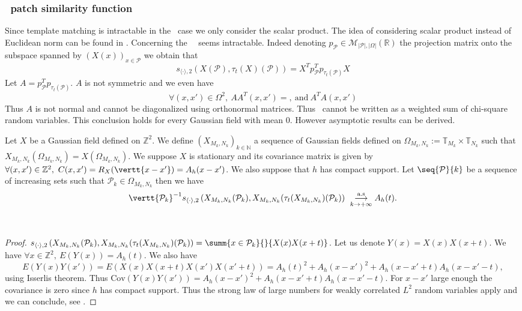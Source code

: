 \subsubsection{\sps \ patch similarity function} Since template matching is intractable
in the  \ case we only consider the scalar product. The idea of considering scalar product
instead of Euclidean norm can be found in \cite{riot2017correlation}. Concerning the
\internalmatching \ \sps \ seems intractable. Indeed denoting
$p_{\mathcal{P}} \in \mathcal{M}_{\vert \mathcal{P} \vert, \vert \Omega
  \vert}\left( \mathbb{R} \right)$ the projection matrix onto the subspace
spanned by $(X(x))_{x\in \mathcal{P}}$ we obtain that
\[s_{\langle \cdot \rangle, 2}\left(X(\mathcal{P}),
    \tau_t(X)(\mathcal{P})\right) = X^T p_{\mathcal{P}}^T
  p_{\tau_t(\mathcal{P})} X\] Let
$A = p_{\mathcal{P}}^T p_{\tau_t(\mathcal{P})}$. $A$ is not symmetric and we
even have
\[\forall (x,x') \in \Omega^2, \ AA^T(x,x') = , \ \text{and} \ A^TA(x,x')\]
Thus $A$ is not normal and cannot be diagonalized using orthonormal
matrices. Thus \sps \ cannot be written as a weighted sum of chi-square random
variables. This conclusion holds for every Gaussian field with mean $0$. However
asymptotic results can be derived.
\begin{prop}
  Let $X$ be a Gaussian field defined on $\mathbb{Z}^2$. We define
  $\left(X_{M_k,N_k}\right)_{k \in \mathbb{N}}$ a sequence of Gaussian fields
  defined on $\Omega_{M_k,N_k} := \mathbb{T}_{M_k} \times \mathbb{T}_{N_k}$ such
  that $X_{M_k,N_k}(\Omega_{M_k,N_k}) = X(\Omega_{M_k,N_k})$. We suppose $X$ is
  stationary and its covariance matrix is given by
  $\forall (x,x') \in \mathbb{Z}^2, \ C(x,x') = R_X(\vertt{x-x'}) =
  A_h(x-x')$. We also suppose that $h$ has compact support. Let
  $\seq{\mathcal{P}}{k}$ be a sequence of increasing sets such that
  $\mathcal{P}_k \in \Omega_{M_k,N_k}$ then we have
  \[\vertt{\mathcal{P}_k}^{-1} s_{\langle \cdot
      \rangle,2}\left(X_{M_k,N_k}(\mathcal{P}_k),
      X_{M_k,N_k}(\tau_t(X_{M_k,N_k})(\mathcal{P}_k) \right) \ \underset{k
      \rightarrow +\infty}{\overset{\text{a.s}}{\longrightarrow}} A_h(t).\]
\end{prop}
\\
\begin{proof}
  $s_{\langle \cdot \rangle,2}\left(X_{M_k,N_k}(\mathcal{P}_k),
    X_{M_k,N_k}(\tau_t(X_{M_k,N_k})(\mathcal{P}_k) \right) = \summ{x \in
    \mathcal{P}_k}{}{X(x)X(x+t)}$. Let us denote $Y(x) = X(x)X(x+t)$. We have
  $\forall x \in \mathbb{Z}^2, \ E(Y(x)) = A_h(t)$. We also have
  \[E(Y(x)Y(x')) = E(X(x)X(x+t)X(x')X(x'+t)) = A_h(t)^2 + A_h(x-x')^2 +
    A_h(x-x'+t)A_h(x-x'-t),\] using Isserlis theorem. Thus
  $\text{Cov}(Y(x)Y(x')) = A_h(x-x')^2 + A_h(x-x'+t)A_h(x-x'-t)$. For $x-x'$
  large enough the covariance is zero since $h$ has compact support.  Thus the
  strong law of large numbers for weakly correlated $L^2$ random variables apply
  and we can conclude, see \cite{bernstein1927extension}.
\end{proof}

